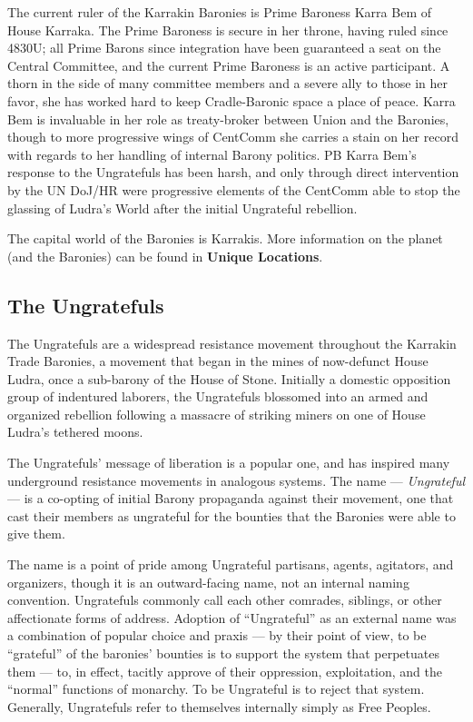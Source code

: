 The current ruler of the Karrakin Baronies is Prime Baroness Karra Bem of House Karraka. The
Prime Baroness is secure in her throne, having ruled since 4830U; all Prime Barons since
integration have been guaranteed a seat on the Central Committee, and the current Prime
Baroness is an active participant. A thorn in the side of many committee members and a severe
ally to those in her favor, she has worked hard to keep Cradle-Baronic space a place of peace.
Karra Bem is invaluable in her role as treaty-broker between Union and the Baronies, though to
more progressive wings of CentComm she carries a stain on her record with regards to her
handling of internal Barony politics. PB Karra Bem’s response to the Ungratefuls has been harsh,
and only through direct intervention by the UN DoJ/HR were progressive elements of the
CentComm able to stop the glassing of Ludra’s World after the initial Ungrateful rebellion.

The capital world of the Baronies is Karrakis. More information on the planet (and the Baronies)
can be found in \textbf{Unique Locations}.

\subsection{The Ungratefuls}

The Ungratefuls are a widespread resistance movement throughout the Karrakin Trade Baronies,
a movement that began in the mines of now-defunct House Ludra, once a sub-barony of the
House of Stone. Initially a domestic opposition group of indentured laborers, the Ungratefuls
blossomed into an armed and organized rebellion following a massacre of striking miners on one
of House Ludra’s tethered moons.

The Ungratefuls’ message of liberation is a popular one, and has inspired many underground
resistance movements in analogous systems. The name — \textit{Ungrateful} — is a co-opting of initial
Barony propaganda against their movement, one that cast their members as ungrateful for the
bounties that the Baronies were able to give them.

The name is a point of pride among Ungrateful partisans, agents, agitators, and organizers,
though it is an outward-facing name, not an internal naming convention. Ungratefuls commonly
call each other comrades, siblings, or other affectionate forms of address. Adoption of
“Ungrateful” as an external name was a combination of popular choice and praxis — by their
point of view, to be “grateful” of the baronies’ bounties is to support the system that perpetuates
them — to, in effect, tacitly approve of their oppression, exploitation, and the “normal” functions
of monarchy. To be Ungrateful is to reject that system. Generally, Ungratefuls refer to themselves
internally simply as Free Peoples.

